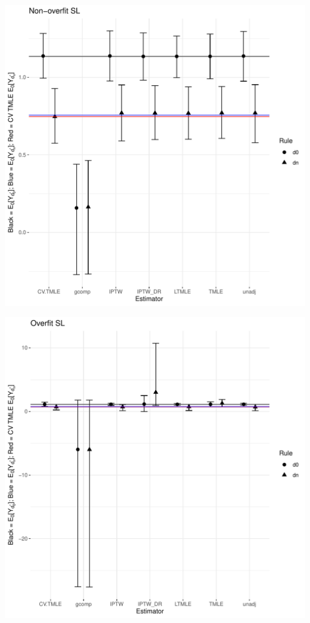 \documentclass[11pt]{article}\usepackage[]{graphicx}\usepackage[]{color}
\makeatletter
\def\maxwidth{ %
  \ifdim\Gin@nat@width>\linewidth
    \linewidth
  \else
    \Gin@nat@width
  \fi
}
\newenvironment{knitrout}{}{} %
\makeatother
\begin{document}
\begin{knitrout}
\includegraphics[width=\maxwidth]{figure/unnamed-chunk-1-3} 

\includegraphics[width=\maxwidth]{figure/unnamed-chunk-1-4} 

\end{knitrout}
\end{document}
